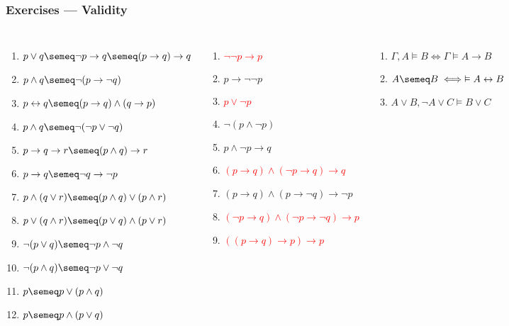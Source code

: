 \documentclass[UTF8,aspectratio=43,11pt,colorlinks,compress,openany]{beamer}%
\begin{document}
\begin{frame}\frametitle{Exercises --- Validity}
		\begin{columns}
				\begin{enumerate}
					\item \textcolor{green}{$p\vee q\semeq\neg p\to q\semeq(p\to q)\to q$}
					\item \textcolor{green}{$p\wedge q\semeq\neg(p\to\neg q)$}
					\item \textcolor{green}{$p\leftrightarrow q\semeq(p\to q)\wedge(q\to p)$}
					\item $p\wedge q\semeq\neg(\neg p\vee\neg q)$
					\item $p\to q\to r\semeq(p\wedge q)\to r$
					\item $p\to q\semeq\neg q\to\neg p$
					\item $p\wedge(q\vee r)\semeq(p\wedge q)\vee(p\wedge r)$
					\item $p\vee(q\wedge r)\semeq(p\vee q)\wedge(p\vee r)$
					\item $\neg(p\vee q)\semeq\neg p\wedge\neg q$
					\item $\neg(p\wedge q)\semeq\neg p\vee\neg q$
					\item $p\semeq p\vee(p\wedge q)$
					\item $p\semeq p\wedge(p\vee q)$
				\end{enumerate}
				\begin{enumerate}
					\item \textcolor{red}{$\neg\neg p\to p$}
					\item $p\to\neg\neg p$
					\item \textcolor{red}{$p\vee\neg p$}
					\item $\neg(p\wedge\neg p)$
					\item $p\wedge\neg p\to q$
					\item \textcolor{red}{$(p\to q)\wedge(\neg p\to q)\to q$}
					\item $(p\to q)\wedge(p\to\neg q)\to\neg p$
					\item \textcolor{red}{$(\neg p\to q)\wedge(\neg p\to\neg q)\to p$}
					\item \textcolor{red}{$((p\to q)\to p)\to p$}
				\end{enumerate}
				\begin{enumerate}
					\item $\Gamma, A\vDash B\iff\Gamma\vDash A\to B$
					\item $A\semeq B\iff\vDash A\leftrightarrow B$
					\item $A\vee B, \neg A\vee C\vDash B\vee C$
				\end{enumerate}
		\end{columns}
\end{frame}
\end{document}
